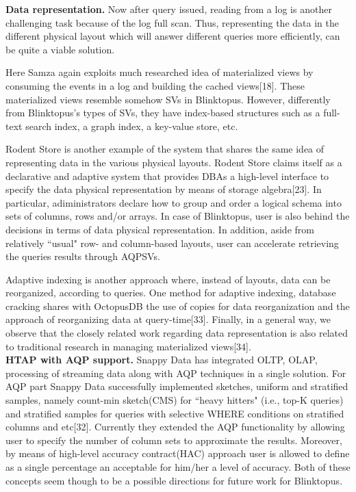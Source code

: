 \documentclass[10pt, conference, compsocconf]{IEEEtran}
\begin{document}
\textbf{Data representation.} Now after query issued, reading from a log is another challenging task because of the log full scan. Thus, representing the data in the different physical layout which will  answer different queries more efficiently, can be quite a viable solution. 

Here Samza again exploits much researched idea of materialized views by consuming the events in a log and building the cached views[18]. These materialized views resemble somehow SVs in Blinktopus. However, differently from Blinktopus's types of SVs, they have index-based structures such as a full-text search index, a graph index, a key-value store, etc. 

Rodent Store is another example of the system that shares the same idea of representing data in the various physical layouts. Rodent Store claims itself as a declarative and adaptive system that provides DBAs a high-level interface to specify the data physical representation by means of storage algebra[23]. In particular, adiministrators declare how to group and order a logical schema into sets of columns, rows and/or arrays. In case of Blinktopus, user is also behind the decisions in terms of data physical representation. In addition, aside from relatively ``usual" row- and column-based layouts, user can accelerate retrieving the queries results through AQPSVs. 

Adaptive indexing is another approach where, instead of layouts, data can be reorganized, according to queries. One method for adaptive indexing, database cracking shares with OctopusDB the use of copies for data reorganization and the approach of reorganizing data at query-time[33]. Finally, in a general way,  we observe that the closely related work regarding data representation is also related to traditional research in managing materialized views[34]. \\
\textbf{HTAP with AQP support.} 
Snappy Data has integrated OLTP, OLAP, processing of streaming data along with  AQP techniques in a single solution. For AQP part Snappy Data successfully implemented sketches, uniform and stratified samples, namely count-min sketch(CMS) for ``heavy hitters" (i.e., top-K queries) and stratified samples for queries with selective WHERE conditions on stratified columns and etc[32]. Currently they extended the AQP functionality by allowing user to specify the number of column sets to approximate the results. Moreover, by means of high-level accuracy contract(HAC) approach user is allowed to define as a single percentage an acceptable for him/her a level of accuracy. Both of these concepts seem though to be a possible directions for future work for Blinktopus.
\end{document}
